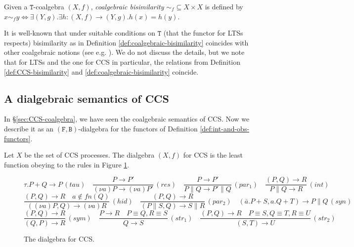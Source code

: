 \documentclass[orivec]{llncs}
\newcommand{\mF}[1]{\mathtt{#1}}
\newcommand{\F}{\mF{F}}
\newcommand{\B}{\mF{B}}
\newcommand{\T}{\mF{T}}
\newcommand{\utr}{\to}
\newcommand{\fn}{\mathit{fn}}
\newcommand{\defend}{}
\renewenvironment{definition}{\begin{defn}}{\defend\end{defn}}
\begin{document}
\begin{definition}\label{def:coalgebraic-bisimilarity}
	Given a $\T$-coalgebra $(X,f)$, \emph{coalgebraic bisimilarity} $\sim_f \subseteq X \times X$ is defined by $x \sim_f y \iff \exists (Y,g) . \exists h : (X,f) \to (Y,g) . h(x) = h(y)$. 
\end{definition}

It is well-known that under suitable conditions on $\T$ (that the functor for LTSs respects) bisimilarity as in Definition \ref{def:coalgebraic-bisimilarity} coincides with other coalgebraic notions (see e.g. \cite{Sta11}). We do not discuss the details, but we note that for LTSs and the one for CCS in particular, the relations from Definition \ref{def:CCS-bisimilarity} and \ref{def:coalgebraic-bisimilarity} coincide.

\subsection{A dialgebraic semantics of CCS}
\label{sec:CCS-dialgebra}

In \S \ref{sec:CCS-coalgebra}, we have seen the coalgebraic semantics of CCS.
Now we describe it as an $(\F,\B)$-dialgebra for the functors of Definition \ref{def:int-and-obs-functors}.

\begin{definition}\label{def:CCS-dialgebra}
Let $X$ be the set of CCS processes. The dialgebra $(X,f)$ for CCS is the least function obeying to the rules in Figure \ref{fig:CCS-dialgebra}.
\end{definition}

\begin{figure}
\begin{scriptsize}
 \begin{centering}
     $$     
     {\tau . P + Q \utr P}\,(tau)
     \quad 
     \frac{P \utr P'}
     {(\nu a) P \utr (\nu a) P'} \, (res) 
     \quad
     \frac{P \utr P'}{P \parallel Q \utr P' \parallel Q}\,(par_1) 
     \quad
     \frac{(P,Q) \utr R}
     {P \parallel Q \utr R} \, (int) 
     $$         
     $$
     \frac{(P,Q) \utr R \quad a \notin \fn(Q) }
          {((\nu a) P,Q) \utr (\nu a) R }\,(hid)
     \quad
     \frac{(P,Q) \utr R}
          {(P \parallel S,Q) \utr S \parallel R}\,(par_2)
     \quad
          {(\bar a.P + S,a.Q + T) \utr P \parallel Q}\,(syn) 
     $$         
     $$
     \frac{(P,Q) \utr R}
          {(Q,P) \utr R} \, (sym)
     \quad 
     \frac{P \utr R\quad P \equiv Q, R \equiv S}
          {Q \utr S} \,(str_1)
     \quad
     \frac{(P,Q) \utr R\quad P \equiv S,Q \equiv T,R \equiv U}
          {(S,T)\utr U}\,(str_2)
      $$
  \end{centering}
\end{scriptsize}
\caption{The dialgebra for CCS.}\label{fig:CCS-dialgebra}
\end{figure}
	
\end{document}
